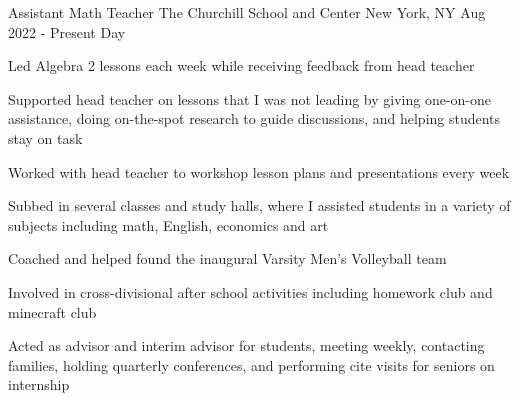 \begin{cventries}
 
   \cventry
    {Assistant Math Teacher}
    {The Churchill School and Center}
    {New York, NY}
    {Aug 2022 - Present Day}
    {
      \begin{cvitems}
        \item {Led Algebra 2 lessons each week while receiving feedback from head teacher}
        \item {Supported head teacher on lessons that I was not leading by giving one-on-one assistance, doing on-the-spot research to guide discussions, and helping students stay on task}
        \item {Worked with head teacher to workshop lesson plans and presentations every week}
        \item {Subbed in several classes and study halls, where I assisted students in a variety of subjects including math, English, economics and art}
        \item {Coached and helped found the inaugural Varsity Men's Volleyball team}
        \item {Involved in cross-divisional after school activities including homework club and minecraft club}
        \item {Acted as advisor and interim advisor for students, meeting weekly, contacting families, holding quarterly conferences, and performing cite visits for seniors on internship}
      \end{cvitems}
    }
    

\end{cventries}
